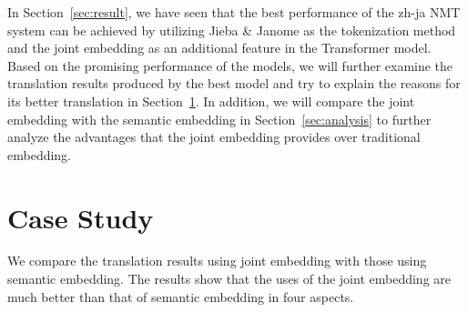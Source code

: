 \hspace{24pt}

In Section~\ref{sec:result}, we have seen that the best performance of the zh-ja NMT system can be achieved by utilizing Jieba \& Janome as the tokenization method and the joint embedding as an additional feature in the Transformer model. Based on the promising performance of the models, we will further examine the translation results produced by the best model and try to explain the reasons for its better translation in Section~\ref{sec:case_study}. In addition, we will compare the joint embedding with the semantic embedding in Section~\ref{sec:analysis} to further analyze the advantages that the joint embedding provides over traditional embedding.

\section{Case Study} \label{sec:case_study}

We compare the translation results using joint embedding with those using semantic embedding. The results show that the uses of the joint embedding are much better than that of semantic embedding in four aspects.

